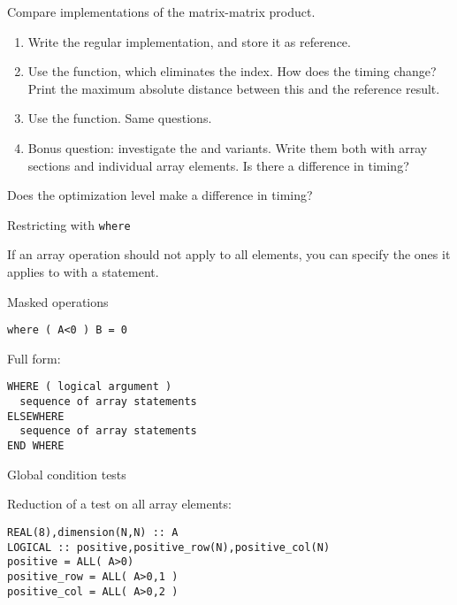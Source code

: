 \begin{exercise}
  \label{ex:fmatmul}
  Compare implementations of the matrix-matrix product.
  \begin{enumerate}
  \item Write the regular  implementation, and store it as
    reference.
  \item Use the  function, which eliminates the 
    index. How does the timing change? Print the maximum absolute
    distance between this and the reference result.
  \item Use the  function. Same questions.
  \item Bonus question: investigate the  and 
    variants. Write them both with array sections and individual array
    elements. Is there a difference in timing?
  \end{enumerate}
  Does the optimization level make a difference in timing?
\end{exercise}

 {Restricting with \tt{where}}

If an array operation should not apply to all elements, you can
specify the ones it applies to with a  statement.

\begin{block}{Masked operations}
  \label{sl:farray-where}
\begin{lstlisting}
where ( A<0 ) B = 0
\end{lstlisting}

Full form:
\begin{lstlisting}
WHERE ( logical argument )
  sequence of array statements
ELSEWHERE
  sequence of array statements
END WHERE
\end{lstlisting}
\end{block}

 {Global condition tests}

Reduction of a test on all array elements:
\begin{lstlisting}
REAL(8),dimension(N,N) :: A
LOGICAL :: positive,positive_row(N),positive_col(N)
positive = ALL( A>0)
positive_row = ALL( A>0,1 )
positive_col = ALL( A>0,2 )
\end{lstlisting}

